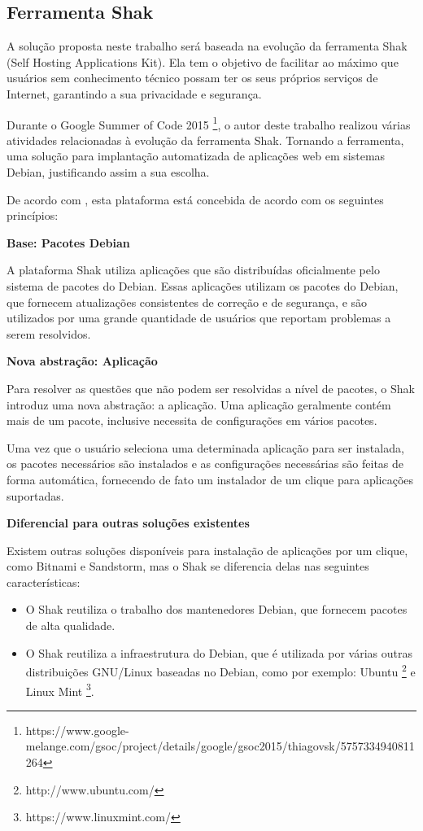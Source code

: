 \subsection{Ferramenta Shak}

A solução proposta neste trabalho será baseada na evolução da ferramenta Shak
(Self Hosting Applications Kit). Ela tem o objetivo de facilitar 
ao máximo que usuários sem conhecimento técnico possam ter os seus próprios 
serviços de Internet, garantindo a sua privacidade e segurança. 

Durante o Google Summer of Code 2015 \footnote{https://www.google-melange.com/gsoc/project/details/google/gsoc2015/thiagovsk/5757334940811264}, o autor deste trabalho realizou 
várias atividades relacionadas à evolução da ferramenta Shak. Tornando a ferramenta, uma
 solução para implantação automatizada de aplicações web em sistemas Debian, 
justificando assim a sua escolha.

De acordo com , esta plataforma está concebida de acordo 
com os seguintes princípios:

\textbf{Base: Pacotes Debian}

A plataforma Shak utiliza aplicações que são distribuídas oficialmente pelo 
sistema de pacotes do Debian. Essas aplicações utilizam os
pacotes do Debian, que fornecem atualizações consistentes de correção e de segurança,
e são utilizados por uma grande quantidade de usuários que reportam problemas a
serem resolvidos.

\textbf{Nova abstração: Aplicação}

Para resolver as questões que não podem ser resolvidas a nível de pacotes, o
Shak introduz uma nova abstração: a aplicação. Uma aplicação geralmente
contém mais de um pacote, inclusive necessita de configurações em vários pacotes.

Uma vez que o usuário seleciona uma determinada aplicação para
ser instalada, os pacotes necessários são instalados e as configurações
necessárias são feitas de forma automática, fornecendo de fato um instalador
de um clique para aplicações suportadas. 

\textbf{Diferencial para outras soluções existentes}

Existem outras soluções disponíveis para instalação de aplicações por um clique,
como Bitnami e Sandstorm, mas o Shak se
diferencia delas nas seguintes características:

\begin{itemize}

  \item O Shak reutiliza o trabalho dos mantenedores Debian, que fornecem pacotes
    de alta qualidade.

  \item O Shak reutiliza a infraestrutura do Debian, que é utilizada por várias
outras distribuições GNU/Linux baseadas no Debian, como por exemplo: Ubuntu \footnote{http://www.ubuntu.com/} e Linux Mint \footnote{https://www.linuxmint.com/}.

\end{itemize}

